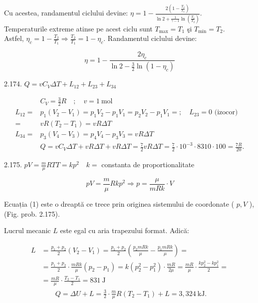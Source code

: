 \documentclass[10pt]{article}
\begin{document}
Cu acestea, randamentul ciclului devine: $\eta=1-\frac{2\left(1-\frac{T_{2}}{T_{1}}\right)}{\ln 2+\frac{1}{\gamma-1} \ln \left(\frac{T_{1}}{T_{2}}\right)}$.\\
Temperaturile extreme atinse pe acest ciclu sunt $T_{\max }=T_{1}$ şi $T_{\min }=T_{2}$.\\
Astfel, $\eta_{c}=1-\frac{T_{2}}{T_{1}} \Rightarrow \frac{T_{2}}{T_{1}}=1-\eta_{c}$. Randamentul ciclului devine:

$$
\eta=1-\frac{2 \eta_{c}}{\ln 2-\frac{3}{2} \ln \left(1-\eta_{c}\right)}
$$

2.174. $Q=v C_{V} \Delta T+L_{12}+L_{23}+L_{34}$

$$
\begin{aligned}
& C_{V}=\frac{3}{2} R \quad ; \quad v=1 \mathrm{~mol} \\
L_{12}= & p_{1}\left(V_{2}-V_{1}\right)=p_{1} V_{2}-p_{1} V_{1}=p_{2} V_{2}-p_{1} V_{1}=; \quad L_{23}=0 \text { (izocor) } \\
= & v R\left(T_{2}-T_{1}\right)=v R \Delta T \\
L_{34}= & p_{3}\left(V_{4}-V_{3}\right)=p_{4} V_{4}-p_{3} V_{3}=v R \Delta T \\
& Q=v C_{V} \Delta T+v R \Delta T+v R \Delta T=\frac{7}{2} v R \Delta T=\frac{7}{2} \cdot 10^{-3} \cdot 8310 \cdot 100=\frac{7 R}{20} .
\end{aligned}
$$

2.175. $p V=\frac{m}{\mu} R T T=k p^{2} \quad k=$ constanta de proportionalitate


\begin{equation*}
p V=\frac{m}{\mu} R k p^{2} \Rightarrow p=\frac{\mu}{m R k} \cdot V \tag{1}
\end{equation*}


Ecuația (1) este o dreaptă ce trece prin originea sistemului de coordonate ( $p, V$ ), (Fig. prob. 2.175).

Lucrul mecanic $L$ este egal cu aria trapezului format. Adică:

$$
\begin{aligned}
L & =\frac{p_{1}+p_{2}}{2}\left(V_{2}-V_{1}\right)=\frac{p_{1}+p_{2}}{2}\left(\frac{p_{2} m R k}{\mu}-\frac{p_{1} m R k}{\mu}\right)= \\
& =\frac{p_{1}+p_{2}}{2} \cdot \frac{m R k}{\mu}\left(p_{2}-p_{1}\right)=k\left(p_{2}^{2}-p_{1}^{2}\right) \cdot \frac{m R}{2 \mu}=\frac{m R}{\mu} \cdot \frac{k p_{2}^{2}-k p_{1}^{2}}{2}= \\
& =\frac{m R}{\mu} \cdot \frac{T_{2}-T_{1}}{2}=831 \mathrm{~J} \\
& \quad \quad Q=\Delta U+L=\frac{3}{2} \cdot \frac{m}{\mu} R\left(T_{2}-T_{1}\right)+L=3,324 \mathrm{~kJ} .
\end{aligned}
$$
\end{document}
